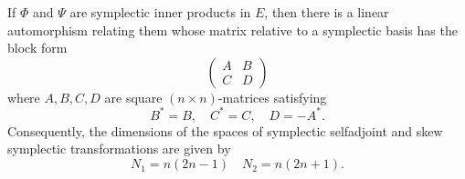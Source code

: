 If $\Phi$ and $\Psi$ are symplectic inner products in $E$, then there is a linear automorphism relating them whose matrix relative to a symplectic basis has the block form
$$\begin{pmatrix} A & B \\ C & D \end{pmatrix}$$
where $A, B, C, D$ are square $(n \times n)$-matrices satisfying
$$B^* = B, \quad C^* = C, \quad D = -A^*.$$
Consequently, the dimensions of the spaces of symplectic selfadjoint and skew symplectic transformations are given by
$$N_1 = n(2n - 1) \quad N_2 = n(2n + 1).$$
